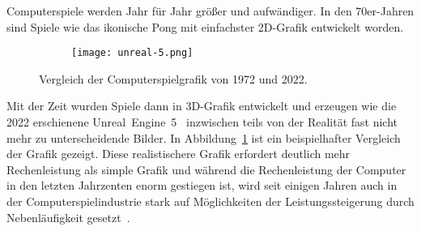 
Computerspiele werden Jahr für Jahr größer und aufwändiger. In den 70er-Jahren sind Spiele wie das ikonische Pong mit einfachster 2D-Grafik entwickelt worden. 
\begin{figure}
	\begin{subfigure}[b]{.49\textwidth}
		\tikzset{external/export next=false}
	\end{subfigure}
	\begin{subfigure}[b]{.49\textwidth}
		\texttt{[image: unreal-5.png]}
	\end{subfigure}
	\caption{Vergleich der Computerspielgrafik von 1972 und 2022.}\label{fig:grafikvergleich}
\end{figure}
Mit der Zeit wurden Spiele dann in 3D-Grafik entwickelt und erzeugen wie die 2022 erschienene Unreal~Engine~5~\cite{EpicGamesInc.} inzwischen teils von der Realität fast nicht mehr zu unterscheidende Bilder. In Abbildung~\ref{fig:grafikvergleich} ist ein beispielhafter Vergleich der Grafik gezeigt. Diese realistischere Grafik erfordert deutlich mehr Rechenleistung als simple Grafik und während die Rechenleistung der Computer in den letzten Jahrzenten enorm gestiegen ist, wird seit einigen Jahren auch in der Computerspielindustrie stark auf Möglichkeiten der Leistungssteigerung durch Nebenläufigkeit gesetzt~\cite{Tatarchuk2014,Genova2015,Gyrling2015,Schott2016,Hodgman2016,White2018}.
